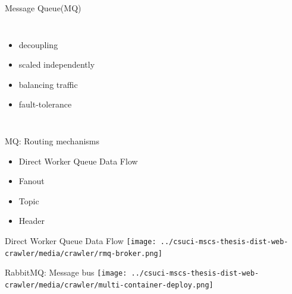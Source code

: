 \documentclass[9pt]{beamer}
\begin{document}

\begin{frame}{Message Queue(MQ)}
  \begin{columns}
    \begin{itemize}
      \pause
    \item decoupling
      \pause
    \item scaled independently
      \pause
     \item balancing traffic
       \pause
     \item fault-tolerance
    \end{itemize}
  \end{columns}
  
\end{frame}


\begin{frame}{MQ: Routing mechanisms}
  \begin{itemize}
    \pause
  \item Direct Worker Queue Data Flow
    \pause
  \item Fanout
    \pause
  \item Topic
    \pause
  \item Header
  \end{itemize}
\end{frame}


\begin{frame}{Direct Worker Queue Data Flow}
  \centering
  \texttt{[image: ../csuci-mscs-thesis-dist-web-crawler/media/crawler/rmq-broker.png]}
\end{frame}


\begin{frame}{RabbitMQ: Message bus}
  \centering
  \texttt{[image: ../csuci-mscs-thesis-dist-web-crawler/media/crawler/multi-container-deploy.png]}
\end{frame}

\end{document}

